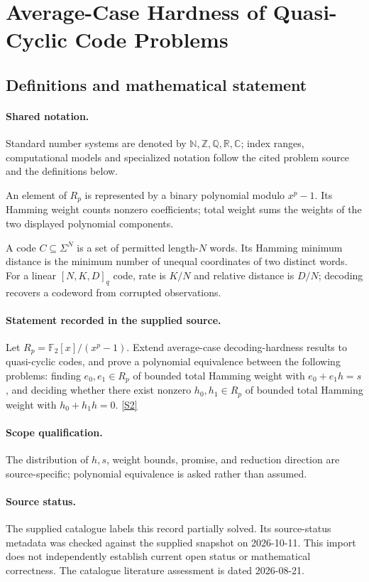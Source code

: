 \documentclass[11pt]{article}
\newcommand{\sref}[2]{\hyperlink{source:#1:#2}{[S#2]}}
\begin{document}
\section{Average-Case Hardness of Quasi-Cyclic Code Problems}\label{statement}

\subsection{Definitions and mathematical statement}

\paragraph{Shared notation.}Standard number systems are denoted by $\mathbb N,\mathbb Z,\mathbb Q,\mathbb R,\mathbb C$; index ranges, computational models and specialized notation follow the cited problem source and the definitions below.


An element of $R_p$ is represented by a binary polynomial modulo $x^p-1$. Its Hamming weight counts nonzero coefficients; total weight sums the weights of the two displayed polynomial components.

A code $C\subseteq\Sigma^N$ is a set of permitted length-$N$ words. Its Hamming minimum distance is the minimum number of unequal coordinates of two distinct words. For a linear $[N,K,D]_q$ code, rate is $K/N$ and relative distance is $D/N$; decoding recovers a codeword from corrupted observations.
\paragraph{Statement recorded in the supplied source.}
Let $R_p=\mathbb F_2[x]/(x^p-1)$. Extend average-case decoding-hardness results to quasi-cyclic codes, and prove a polynomial equivalence between the following problems: finding $e_0,e_1\in R_p$ of bounded total Hamming weight with $e_0+e_1h=s$, and deciding whether there exist nonzero $h_0,h_1\in R_p$ of bounded total Hamming weight with $h_0+h_1h=0$. \sref{statement}{2}
\paragraph{Scope qualification.}
The distribution of $h,s$, weight bounds, promise, and reduction direction are source-specific; polynomial equivalence is asked rather than assumed.
\paragraph{Source status.}
The supplied catalogue labels this record partially solved. Its source-status metadata was checked against the supplied snapshot on 2026-10-11. This import does not independently establish current open status or mathematical correctness. The catalogue literature assessment is dated 2026-08-21.
\end{document}
